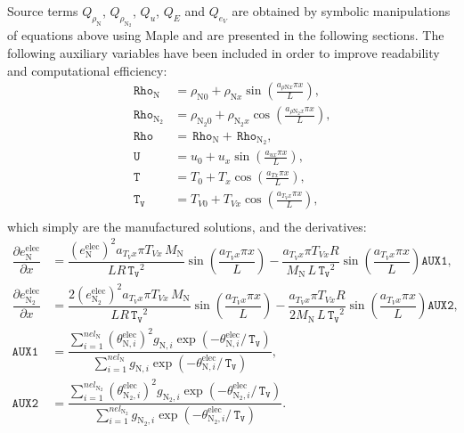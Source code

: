 \documentclass[10pt]{article}
\newcommand{\diff}[2] {\dfrac{\partial #1 }{\partial #2}}
\newcommand{\Rho}{\,\mathtt{Rho}}
\newcommand{\T}{\,\mathtt{T}}
\newcommand{\U}{\,\mathtt{U}}
\newcommand{\TV}{\,\mathtt{T_V}}
\newcommand{\N}{\text{N}}
\newcommand{\elec}{\text{elec}}
\begin{document}
Source terms $ Q_{\rho_{\text{N}}}$, $ Q_{\rho_{\text{N}_2}}$, $Q_u$,  $Q_{E}$ and $Q_{e_V}$ are obtained by symbolic manipulations of equations above using Maple and are presented in the following sections. The following auxiliary variables have been included in order to improve readability and computational efficiency:
\begin{equation}
 \begin{split}
\label{eq:aux_1d}
\Rho_{\text{N}} &= \rho_{\text{N}0} + \rho_{\text{N}x} \sin\left(\frac{a_{  \rho \text{N} x }\pi x}{L}\right),\\
\Rho_{\text{N}_2} &= \rho_{\text{N}_2 0}+ \rho_{\text{N}_2 x} \cos\left(\frac{a_{ \rho \text{N}_2 x } \pi x}{L}\right),\\
\Rho&=\Rho_{\text{N}}+\Rho_{\text{N}_2},\\
\U &= u_{0}+u_{x} \sin\left(\frac{a_{u x} \pi x}{L}\right),\\
\T &= T_{0}+T_{x} \cos\left(\frac{a_{T x} \pi x}{L}\right),\\
\TV &= T_{V0}+T_{Vx} \cos\left(\frac{a_{T_V x} \pi x}{L}\right),\\
\end{split}
\end{equation}
which simply are the manufactured solutions, and the derivatives:
\begin{equation}
\begin{split}\label{eq:aux_01}
%
\diff{e_{\N}^{\elec}}{x} &= \dfrac{(e_{\N}^{\elec})^2  a_{T_V x} \pi T_{Vx} \,M_\N}{ LR \TV^2}\sin\left(\dfrac{a_{T_V x} \pi x}{L}\right) - \dfrac{  a_{T_V x} \pi T_{Vx} R }{M_\N \, L \TV^2 }\sin\left(\dfrac{a_{T_V x} \pi x}{L}\right)\mathtt{AUX1},	\\
%
\diff{e_{\N_2}^{\elec}}{x} &= \dfrac{2 (e_{\N_2}^{\elec})^2 a_{T_V x} \pi T_{Vx} \,M_\N}{ LR \TV^2}\sin\left(\dfrac{a_{T_V x} \pi x}{L}\right)- \dfrac{  a_{T_V x} \pi T_{Vx} R }{2M_\N \, L \TV^2 }\sin\left(\dfrac{a_{T_V x} \pi x}{L}\right)\mathtt{AUX2},	\\
%
\texttt{AUX1} &= \dfrac{\sum_{i=1}^{nel_{\N}}( \theta^{\elec}_{\N,i})^2 g_{\N,i} \exp\left(- \theta^{\elec}_{\N,i}/ \TV \right)} { \sum_{i=1}^{nel_{\N}} g_{\N,i} \exp\left(-\theta^{\elec}_{\N,i}/\TV\right)},	\\
%
\texttt{AUX2} &= \dfrac{\sum_{i=1}^{nel_{\N_2}}( \theta^{\elec}_{\N_2,i})^2 g_{\N_2,i} \exp\left(- \theta^{\elec}_{\N_2,i} / \TV \right)} {\sum_{i=1}^{nel_{\N_2}} g_{\N_2,i} \exp\left(-\theta^{\elec}_{\N_2,i}/\TV\right)}.
%	
\end{split}
\end{equation}
\end{document}
